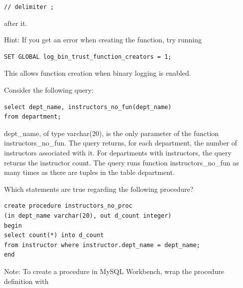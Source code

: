 \documentclass[12pt, addpoints, answers]{exam}
\begin{document}
\begin{questions}
\begin{minipage}{\linewidth}
{\texttt{// delimiter ;}

after it.}

\par\vspace{0.5em}

{\footnotesize Hint: If you get an error when creating the function, try running}
\begin{verbatim}
SET GLOBAL log_bin_trust_function_creators = 1;
\end{verbatim}
{\footnotesize This allows function creation when binary logging is enabled.}

\par\vspace{0.5em}

Consider the following query:

\begin{verbatim}
select dept_name, instructors_no_fun(dept_name)
from department;
\end{verbatim}

\par\vspace{0.5em}

\begin{checkboxes}
    \CorrectChoice dept\_name, of type varchar(20), is the only parameter of the function instructors\_no\_fun.
    \CorrectChoice The query returns, for each department, the number of instructors associated with it.
    \choice For departments with instructors, the query returns the instructor count.
    \CorrectChoice The query runs function instructors\_no\_fun as many times as there are tuples in the table department.
\end{checkboxes}
\end{minipage}\vspace{1em}

\begin{minipage}{\linewidth}
\question[4]
Which statements are true regarding the following procedure?\par\vspace{0.5em}

\begin{verbatim}
create procedure instructors_no_proc
(in dept_name varchar(20), out d_count integer)
begin
select count(*) into d_count 
from instructor where instructor.dept_name = dept_name;
end
\end{verbatim}

{\footnotesize Note: To create a procedure in MySQL Workbench, wrap the procedure definition with

}
\end{minipage}
\end{questions}
\end{document}
